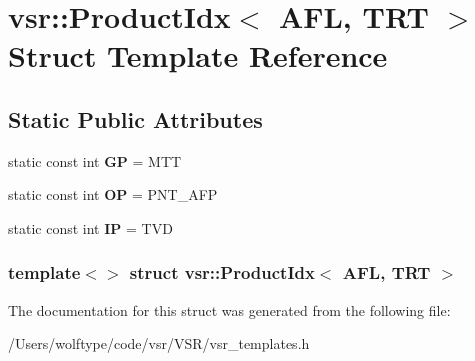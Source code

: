 \hypertarget{structvsr_1_1_product_idx_3_01_a_f_l_00_01_t_r_t_01_4}{\section{vsr\-:\-:Product\-Idx$<$ A\-F\-L, T\-R\-T $>$ Struct Template Reference}
\label{structvsr_1_1_product_idx_3_01_a_f_l_00_01_t_r_t_01_4}
}
\subsection*{Static Public Attributes}
\begin{DoxyCompactItemize}
\item 
\hypertarget{structvsr_1_1_product_idx_3_01_a_f_l_00_01_t_r_t_01_4_a52d9c716a05ed71e1a3cbe6bd1bb8842}{static const int {\bfseries G\-P} = M\-T\-T}\label{structvsr_1_1_product_idx_3_01_a_f_l_00_01_t_r_t_01_4_a52d9c716a05ed71e1a3cbe6bd1bb8842}

\item 
\hypertarget{structvsr_1_1_product_idx_3_01_a_f_l_00_01_t_r_t_01_4_a235dfd374a2cb340954e75a2b439f88b}{static const int {\bfseries O\-P} = P\-N\-T\-\_\-\-A\-F\-P}\label{structvsr_1_1_product_idx_3_01_a_f_l_00_01_t_r_t_01_4_a235dfd374a2cb340954e75a2b439f88b}

\item 
\hypertarget{structvsr_1_1_product_idx_3_01_a_f_l_00_01_t_r_t_01_4_a2de1e283706d74d7b14bbc2c7e6c6317}{static const int {\bfseries I\-P} = T\-V\-D}\label{structvsr_1_1_product_idx_3_01_a_f_l_00_01_t_r_t_01_4_a2de1e283706d74d7b14bbc2c7e6c6317}

\end{DoxyCompactItemize}
\subsubsection*{template$<$$>$ struct vsr\-::\-Product\-Idx$<$ A\-F\-L, T\-R\-T $>$}



The documentation for this struct was generated from the following file\-:\begin{DoxyCompactItemize}
\item 
/\-Users/wolftype/code/vsr/\-V\-S\-R/vsr\-\_\-templates.\-h\end{DoxyCompactItemize}
